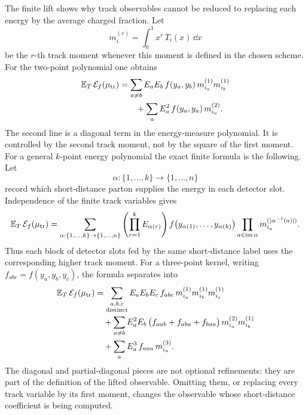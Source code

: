 The finite lift shows why track observables cannot be reduced to replacing
each energy by the average charged fraction.  Let
\[
  m_i^{(r)}=\int_0^1 x^r\,T_i(x)\,\dd x
\]
be the \(r\)-th track moment whenever this moment is defined in the chosen
scheme.  For the two-point polynomial one obtains
\begin{align}
  \mathbb E_T\,\mathcal E_f(\mu_{\rm tr})
  &=
  \sum_{a\neq b}
  E_aE_b\,f(y_a,y_b)\,
  m_{i_a}^{(1)}m_{i_b}^{(1)}
  \nonumber\\
  &\hspace{2em}
  +
  \sum_a
  E_a^2\,f(y_a,y_a)\,
  m_{i_a}^{(2)} .
  \label{eq:track-lift-two-point-moment-formula}
\end{align}
The second line is a diagonal term in the energy-measure polynomial.  It is
controlled by the second track moment, not by the square of the first moment.
For a general \(k\)-point energy polynomial the exact finite formula is the
following.  Let
\[
  \alpha:\{1,\ldots,k\}\longrightarrow\{1,\ldots,n\}
\]
record which short-distance parton supplies the energy in each detector slot.
Independence of the finite track variables gives
\begin{equation}
  \mathbb E_T\,\mathcal E_f(\mu_{\rm tr})
  =
  \sum_{\alpha:\{1,\ldots,k\}\to\{1,\ldots,n\}}
  \left(\prod_{r=1}^{k}E_{\alpha(r)}\right)
  f\!\left(y_{\alpha(1)},\ldots,y_{\alpha(k)}\right)
  \prod_{a\in\operatorname{im}\alpha}
  m_{i_a}^{(|\alpha^{-1}(a)|)} .
  \label{eq:track-lift-general-k-point-formula}
\end{equation}
Thus each block of detector slots fed by the same short-distance label uses
the corresponding higher track moment.  For a three-point kernel, writing
\(f_{abc}=f(y_a,y_b,y_c)\), the formula separates into
\begin{align}
  \mathbb E_T\,\mathcal E_f(\mu_{\rm tr})
  &=
  \sum_{\substack{a,b,c\\\text{distinct}}}
  E_aE_bE_c\,f_{abc}\,
  m_{i_a}^{(1)}m_{i_b}^{(1)}m_{i_c}^{(1)}
  \nonumber\\
  &\quad+
  \sum_{a\ne b}
  E_a^2E_b\,
  \bigl(f_{aab}+f_{aba}+f_{baa}\bigr)\,
  m_{i_a}^{(2)}m_{i_b}^{(1)}
  \nonumber\\
  &\quad+
  \sum_a
  E_a^3\,f_{aaa}\,m_{i_a}^{(3)} .
  \label{eq:track-lift-three-point-moment-formula}
\end{align}
The diagonal and partial-diagonal pieces are not optional refinements: they
are part of the definition of the lifted observable.  Omitting them, or
replacing every track variable by its first moment, changes the observable
whose short-distance coefficient is being computed.

